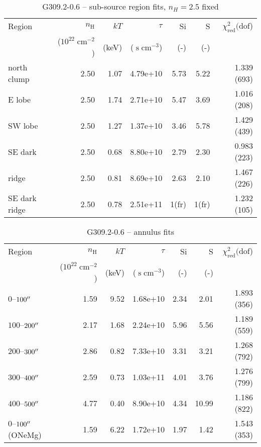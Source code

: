 \documentclass[preprint2,tighten,trackchanges]{aastex6}
\newcommand*{\mt}{\mathrm}
\newcommand*{\unit}[1]{\;\mt{#1}}  %
\begin{document}
\begin{table*}
    \centering
    \caption{G309.2-0.6 -- sub-source region fits, $n_H=2.5$ fixed}
    \begin{tabular}{@{}lrrrrrr@{}}
        \toprule
        Region & $n_\mathrm{H}$             & $kT$  & $\tau$                & Si  & S   & $\chi^2_{\mathrm{red}} (\mathrm{dof}$) \\
               & ($10^{22} \unit{cm^{-2}}$) & (keV) & ($\unit{s\;cm^{-3}}$) & (-) & (-) &  \\
        \midrule
        north clump & 2.50 & 1.07 & 4.79e+10 & 5.73 & 5.22 & 1.339 (693) \\  %
        E lobe & 2.50 & 1.74 & 2.71e+10 & 5.47 & 3.69 & 1.016 (208) \\  %
        SW lobe & 2.50 & 1.27 & 1.37e+10 & 3.46 & 5.78 & 1.429 (439) \\  %
        SE dark & 2.50 & 0.68 & 8.80e+10 & 2.79 & 2.30 & 0.983 (223) \\  %
        \midrule
        ridge & 2.50 & 0.81 & 8.69e+10 & 2.63 & 2.10 & 1.467 (226) \\  %
        SE dark ridge & 2.50 & 0.78 & 2.51e+11 & 1(fr) & 1(fr) & 1.232 (105) \\  %
        \bottomrule
    \end{tabular}
\end{table*}

\begin{table*}
    \centering
    \caption{G309.2-0.6 -- annulus fits}
    \begin{tabular}{@{}lrrrrrr@{}}
        \toprule
        Region & $n_\mathrm{H}$             & $kT$  & $\tau$                & Si  & S   & $\chi^2_{\mathrm{red}} (\mathrm{dof}$) \\
               & ($10^{22} \unit{cm^{-2}}$) & (keV) & ($\unit{s\;cm^{-3}}$) & (-) & (-) &  \\
        \midrule
        $0$--$100\mbox{$^{\prime\prime}$}$ & 1.59 & 9.52 & 1.68e+10 & 2.34 & 2.01 & 1.893 (356) \\  %
        $100$--$200\mbox{$^{\prime\prime}$}$ & 2.17 & 1.68 & 2.24e+10 & 5.96 & 5.56 & 1.189 (559) \\  %
        $200$--$300\mbox{$^{\prime\prime}$}$ & 2.86 & 0.82 & 7.33e+10 & 3.31 & 3.21 & 1.268 (792) \\  %
        $300$--$400\mbox{$^{\prime\prime}$}$ & 2.59 & 0.73 & 1.03e+11 & 4.01 & 3.76 & 1.276 (799) \\  %
        $400$--$500\mbox{$^{\prime\prime}$}$ & 4.77 & 0.40 & 8.90e+10 & 4.34 & 10.99 & 1.186 (822) \\  %
        \midrule
        $0$--$100\mbox{$^{\prime\prime}$}$ (ONeMg) & 1.59 & 6.22 & 1.72e+10 & 1.97 & 1.42 & 1.543 (353) \\  %
        \bottomrule
    \end{tabular}
\end{table*}
\end{document}
